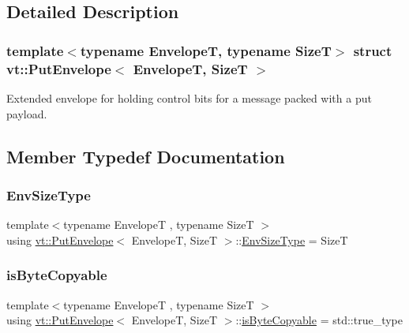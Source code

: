 \subsection{Detailed Description}
\subsubsection*{template$<$typename EnvelopeT, typename SizeT$>$\newline
struct vt\+::\+Put\+Envelope$<$ Envelope\+T, Size\+T $>$}

Extended envelope for holding control bits for a message packed with a put payload. 

\subsection{Member Typedef Documentation}
\mbox{\label{structvt_1_1_put_envelope_ad086e484eb23ab04b0a055aff2cb7b19}} 
\subsubsection{\texorpdfstring{Env\+Size\+Type}{EnvSizeType}}
{\footnotesize\ttfamily template$<$typename EnvelopeT , typename SizeT $>$ \\
using \hyperlink{structvt_1_1_put_envelope}{vt\+::\+Put\+Envelope}$<$ EnvelopeT, SizeT $>$\+::\hyperlink{structvt_1_1_put_envelope_ad086e484eb23ab04b0a055aff2cb7b19}{Env\+Size\+Type} =  SizeT}

\mbox{\label{structvt_1_1_put_envelope_a64bb0e1e7e7db39c62edbc9ee312fc24}} 
\subsubsection{\texorpdfstring{is\+Byte\+Copyable}{isByteCopyable}}
{\footnotesize\ttfamily template$<$typename EnvelopeT , typename SizeT $>$ \\
using \hyperlink{structvt_1_1_put_envelope}{vt\+::\+Put\+Envelope}$<$ EnvelopeT, SizeT $>$\+::\hyperlink{structvt_1_1_put_envelope_a64bb0e1e7e7db39c62edbc9ee312fc24}{is\+Byte\+Copyable} =  std\+::true\+\_\+type}

